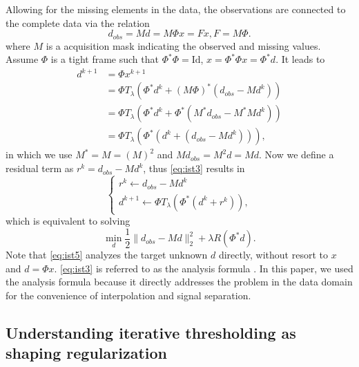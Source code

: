 Allowing for the missing elements in the data, the observations are connected to the complete data via the relation
\begin{equation}
 d_{obs}=Md=M\Phi x=Fx, F=M\Phi.
 \end{equation}
where $M$ is a acquisition mask indicating the observed and missing values. Assume $\Phi$ is a tight frame such that $\Phi^*\Phi=\mathrm{Id}$, $x=\Phi^*\Phi x=\Phi^*d$. It leads to
\begin{equation}\label{eq:ist3}
  \begin{array}{ll}
    d^{k+1} & =\Phi x^{k+1} \\
      & =\Phi T_{\lambda}(\Phi^*d^{k}+(M\Phi)^*(d_{obs}-Md^{k})) \\
      & =\Phi T_{\lambda}(\Phi^*d^{k}+\Phi^*(M^*d_{obs}-M^*Md^{k})) \\
      & =\Phi T_{\lambda}(\Phi^*(d^{k}+(d_{obs}-Md^{k}))),
  \end{array}
\end{equation}
in which we use $M^*=M=(M)^2$ and $Md_{obs}=M^2d=Md$. Now we define a residual term as $r^{k}=d_{obs}-Md^{k}$, thus \eqref{eq:ist3} results in
\begin{equation}\label{eq:ist4}
  \left\{
  \begin{array}{l}
    r^{k}\leftarrow d_{obs}-Md^{k} \\
    d^{k+1}\leftarrow \Phi T_{\lambda}(\Phi^*(d^{k}+r^{k})),
  \end{array}
  \right.
\end{equation}
which is equivalent to solving
\begin{equation}\label{eq:ist5}
  \min\limits_{d}\frac{1}{2}\|d_{obs}-Md\|_2^2+\lambda R(\Phi^{*}d).
\end{equation}
Note that \eqref{eq:ist5} analyzes the target unknown $d$ directly, without resort to $x$ and $d=\Phi x$. \eqref{eq:ist3} is referred to as the analysis formula \citep{elad2007analysis}. In this paper, we used the analysis formula because it directly addresses the problem in the data domain for the convenience of interpolation and signal separation.


\subsection{Understanding iterative thresholding as shaping regularization}

